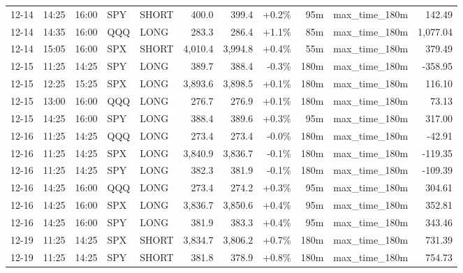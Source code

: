 \documentclass[11pt,a4paper,twoside]{article}
\begin{document}
\begin{center}
\begin{longtable}{>{\color{txtmain}}l l l l l r r r r >{\color{txtmain}}l r}
12-14 & 14:25 & 16:00 & SPY & SHORT & 400.0 & 399.4 & \textcolor{wingreen}{+0.2\%} & 95m & max\_time\_180m & \textcolor{wingreen}{142.49} \\
12-14 & 14:35 & 16:00 & QQQ & LONG & 283.3 & 286.4 & \textcolor{wingreen}{+1.1\%} & 85m & max\_time\_180m & \textcolor{wingreen}{1,077.04} \\
12-14 & 15:05 & 16:00 & SPX & SHORT & 4,010.4 & 3,994.8 & \textcolor{wingreen}{+0.4\%} & 55m & max\_time\_180m & \textcolor{wingreen}{379.49} \\
12-15 & 11:25 & 14:25 & SPY & LONG & 389.7 & 388.4 & \textcolor{lossred}{-0.3\%} & 180m & max\_time\_180m & \textcolor{lossred}{-358.95} \\
12-15 & 12:25 & 15:25 & SPX & LONG & 3,893.6 & 3,898.5 & \textcolor{wingreen}{+0.1\%} & 180m & max\_time\_180m & \textcolor{wingreen}{116.10} \\
12-15 & 13:00 & 16:00 & QQQ & LONG & 276.7 & 276.9 & \textcolor{wingreen}{+0.1\%} & 180m & max\_time\_180m & \textcolor{wingreen}{73.13} \\
12-15 & 14:25 & 16:00 & SPY & LONG & 388.4 & 389.6 & \textcolor{wingreen}{+0.3\%} & 95m & max\_time\_180m & \textcolor{wingreen}{317.00} \\
12-16 & 11:25 & 14:25 & QQQ & LONG & 273.4 & 273.4 & \textcolor{lossred}{-0.0\%} & 180m & max\_time\_180m & \textcolor{lossred}{-42.91} \\
12-16 & 11:25 & 14:25 & SPX & LONG & 3,840.9 & 3,836.7 & \textcolor{lossred}{-0.1\%} & 180m & max\_time\_180m & \textcolor{lossred}{-119.35} \\
12-16 & 11:25 & 14:25 & SPY & LONG & 382.3 & 381.9 & \textcolor{lossred}{-0.1\%} & 180m & max\_time\_180m & \textcolor{lossred}{-109.39} \\
12-16 & 14:25 & 16:00 & QQQ & LONG & 273.4 & 274.2 & \textcolor{wingreen}{+0.3\%} & 95m & max\_time\_180m & \textcolor{wingreen}{304.61} \\
12-16 & 14:25 & 16:00 & SPX & LONG & 3,836.7 & 3,850.6 & \textcolor{wingreen}{+0.4\%} & 95m & max\_time\_180m & \textcolor{wingreen}{352.81} \\
12-16 & 14:25 & 16:00 & SPY & LONG & 381.9 & 383.3 & \textcolor{wingreen}{+0.4\%} & 95m & max\_time\_180m & \textcolor{wingreen}{343.46} \\
12-19 & 11:25 & 14:25 & SPX & SHORT & 3,834.7 & 3,806.2 & \textcolor{wingreen}{+0.7\%} & 180m & max\_time\_180m & \textcolor{wingreen}{731.39} \\
12-19 & 11:25 & 14:25 & SPY & SHORT & 381.8 & 378.9 & \textcolor{wingreen}{+0.8\%} & 180m & max\_time\_180m & \textcolor{wingreen}{754.73} \\

\end{longtable}
\end{center}
\end{document}
